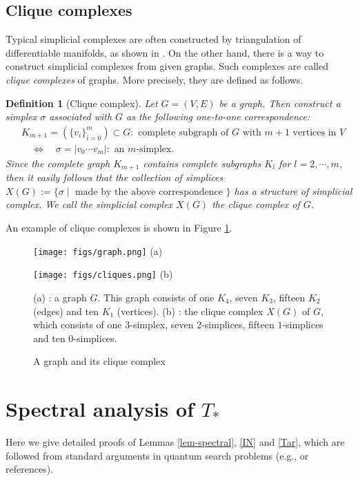 \documentclass[a4paper,12pt]{article}
\newtheorem{definition}{Definition}[section]
\numberwithin{equation}{section}
\begin{document}
\subsection{Clique complexes}
Typical simplicial complexes are often constructed by triangulation of differentiable manifolds, as shown in \cite{MOSver1}.
On the other hand, there is a way to construct simplicial complexes from given graphs.
Such complexes are called {\em clique complexes} of graphs.
More precisely, they are defined as follows.
\begin{definition}[Clique complex]\rm
Let $G=(V,E)$ be a graph.
Then construct a simplex $\sigma$ associated with $G$ as the following one-to-one correspondence:
\begin{align*}
&K_{m+1} = (\{v_i\}_{i=0}^m)\subset G : \text{ complete subgraph of $G$ with $m+1$ vertices in $V$}\\
&\quad \Leftrightarrow \quad \sigma = |v_0\cdots v_m| : \text{ an $m$-simplex}.
\end{align*}
Since the complete graph $K_{m+1}$ contains complete subgraphs $K_l$ for $l=2,\cdots, m$, then it easily follows that the collection
of simplices $X(G) := \{\sigma \mid \text{ made by the above correspondence }\}$ has a structure of simplicial complex.
We call the simplicial complex $X(G)$ {\em the clique complex} of $G$.
\end{definition}
An example of clique complexes is shown in Figure \ref{fig-clique}.

\begin{figure}[htbp]\em
\begin{minipage}{0.5\hsize}
\centering
\texttt{[image: figs/graph.png]}
(a)
\end{minipage}
\begin{minipage}{0.5\hsize}
\centering
\texttt{[image: figs/cliques.png]}
(b)
\end{minipage}
\caption{A graph and its clique complex}
\label{fig-clique}
(a) : a graph $G$. This graph consists of one $K_4$, seven $K_3$, fifteen $K_2$ (edges) and ten $K_1$ (vertices).
(b) : the clique complex $X(G)$ of $G$, which consists of one $3$-simplex, seven $2$-simplices, fifteen $1$-simplices and ten $0$-simplices.
\end{figure}









\section{Spectral analysis of $T_\ast$}
\label{appendix-spectral}
Here we give detailed proofs of Lemmas \ref{lem-spectral}, \ref{IN} and \ref{Tar}, which are followed from standard arguments in quantum search problems (e.g., \cite{P2013} or references). 
\end{document}
